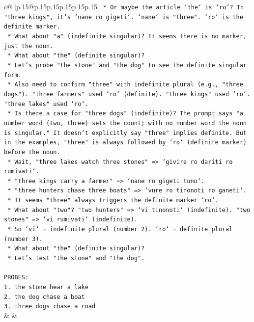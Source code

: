 \documentclass{article}
\begin{document}
{\begin{supertabular}{c@{$\;$}|p{.15\linewidth}@{}p{.15\linewidth}p{.15\linewidth}p{.15\linewidth}p{.15\linewidth}p{.15\linewidth}}
{{{\texttt{    *   Or maybe the article `the` is `ro`? In "three kings", it's `nane ro gigeti`. `nane` is "three". `ro` is the definite marker.} \\
\texttt{    *   What about "a" (indefinite singular)? It seems there is no marker, just the noun.} \\
\texttt{    *   What about "the" (definite singular)?} \\
\texttt{    *   Let's probe "the stone" and "the dog" to see the definite singular form.} \\
\texttt{    *   Also need to confirm "three" with indefinite plural (e.g., "three dogs"). "three farmers" used `ro` (definite). "three kings" used `ro`. "three lakes" used `ro`.} \\
\texttt{    *   Is there a case for "three dogs" (indefinite)? The prompt says "a number word (two, three) sets the count; with no number word the noun is singular." It doesn't explicitly say "three" implies definite. But in the examples, "three" is always followed by `ro` (definite marker) before the noun.} \\
\texttt{    *   Wait, "three lakes watch three stones" => `givire ro dariti ro rumivati`.} \\
\texttt{    *   "three kings carry a farmer" => `nane ro gigeti tuno`.} \\
\texttt{    *   "three hunters chase three boats" => `vure ro tinonoti ro ganeti`.} \\
\texttt{    *   It seems "three" always triggers the definite marker `ro`.} \\
\texttt{    *   What about "two"? "two hunters" => `vi tinonoti` (indefinite). "two stones" => `vi rumivati` (indefinite).} \\
\texttt{    *   So `vi` = indefinite plural (number 2). `ro` = definite plural (number 3).} \\
\texttt{    *   What about "the" (definite singular)?} \\
\texttt{    *   Let's test "the stone" and "the dog".} \\
\\ 
\texttt{PROBES:} \\
\texttt{1. the stone hear a lake} \\
\texttt{2. the dog chase a boat} \\
\texttt{3. three dogs chase a road} \\
            }
        }
    }
    & & \\ \\


\end{supertabular}}
\end{document}
